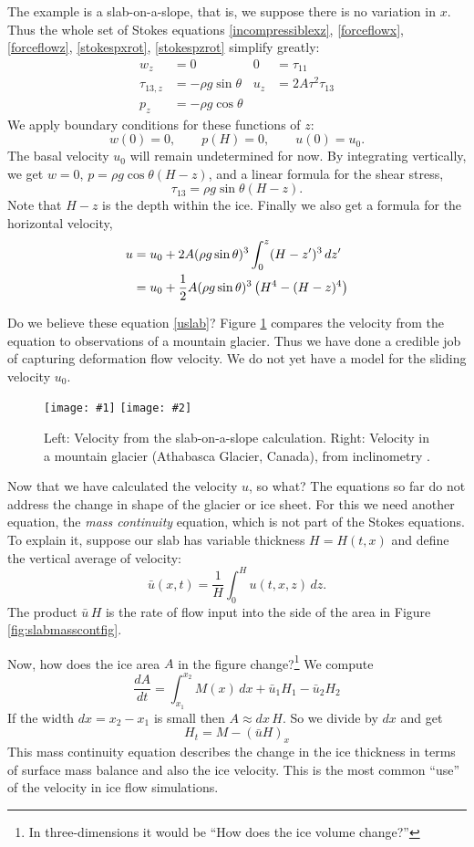 \documentclass[titlepage,letterpaper,final,12pt]{scrartcl}
\newcommand{\twofigsizes}[5]{
\begin{figure}[ht]
\centering
\texttt{[image: \#1]} \quad
\texttt{[image: \#2]}
\caption{#3}
\label{fig:#1}
\end{figure}}
\begin{document}
The example is a slab-on-a-slope, that is, we suppose there is no variation in $x$.  Thus the whole set of Stokes equations \eqref{incompressiblexz}, \eqref{forceflowx}, \eqref{forceflowz}, \eqref{stokespxrot}, \eqref{stokespzrot} simplify greatly:
\begin{align*}
w_z &= 0 &   0 &= \tau_{11} \\
\tau_{13,z} &= - \rho g \sin\theta &   u_z &= 2 A \tau^2 \tau_{13} \\
p_z &= - \rho g \cos\theta
\end{align*}
We apply boundary conditions for these functions of $z$:
	$$w(0)=0, \qquad p(H)=0, \qquad u(0)=u_0.$$
The basal velocity $u_0$ will remain undetermined for now.  By integrating vertically, we get $w=0$, $p = \rho g \cos\theta (H-z)$, and a linear formula for the shear stress,
	$$\tau_{13} = \rho g \sin\theta (H-z).$$
Note that $H-z$ is the depth within the ice.  Finally we also get a formula for the horizontal velocity,
\begin{align}
u &= u_0 + 2 A (\rho g \sin\theta)^3 \int_0^z (H-z')^3\,dz' \notag \\
     &= u_0 + \frac{1}{2} A (\rho g \sin\theta)^3  \left(H^4 - (H-z)^4\right) \label{uslab}
\end{align}

Do we believe these equation \eqref{uslab}?  Figure \ref{fig:slabvel} compares the velocity from the equation to observations of a mountain glacier.  Thus we have done a credible job of capturing deformation flow velocity.  We do not yet have a model for the sliding velocity $u_0$.  

\twofigsizes{slabvel}{athabasca_deform}{Left:  Velocity from the slab-on-a-slope calculation.  Right:  Velocity in a mountain glacier (Athabasca Glacier, Canada), from inclinometry \cite{SavagePaterson}.}{2.4in}{2.0in}

Now that we have calculated the velocity $u$, so what?  The equations so far do not address the change in shape of the glacier or ice sheet.  For this we need another equation, the \emph{mass continuity} equation, which is not part of the Stokes equations.  To explain it, suppose our slab has variable thickness $H=H(t,x)$ and define the vertical average of velocity:
	$$\bar u(x,t) = \frac{1}{H}\int_0^{H} u(t,x,z)\,dz.$$
The product $\bar u\, H$ is the rate of flow input into the side of the area in Figure \ref{fig:slabmasscontfig}.

Now, how does the ice area $A$ in the figure change?\footnote{In three-dimensions it would be ``How does the ice volume change?''}  We compute
	$$\frac{dA}{dt} = \int_{x_1}^{x_2} M(x)\,dx + \bar u_1 H_1 - \bar u_2 H_2$$
If the width $dx=x_2-x_1$ is small then $A\approx dx\, H$.  So we divide by $dx$ and get
\begin{equation}
H_t = M - \left(\bar u H\right)_x \label{masscont1D}
\end{equation}
This mass continuity equation describes the change in the ice thickness in terms of surface mass balance and also the ice velocity.  This is the most common ``use'' of the velocity in ice flow simulations.
\end{document}

